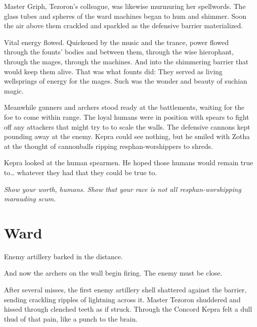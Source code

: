 \documentclass
  [a4paper,
   12pt,
   oneside
  ]%
  {article}
\begin{document}
Master Griph, Tezoron's colleague, was likewise murmuring her spellwords. 
The glass tubes and spheres of the ward machines began to hum and shimmer. Soon the air above them crackled and sparkled as the defensive barrier materialized.

Vital energy flowed. 
Quickened by the music and the trance, power flowed through the founts' bodies and between them, through the wise hierophant, through the mages, through the machines. And into the shimmering barrier that would keep them alive. 
That was what founts did: They served as living wellsprings of energy for the mages.
Such was the wonder and beauty of suchian magic.

Meanwhile gunners and archers stood ready at the battlements, waiting for the foe to come within range. 
The loyal humans were in position with spears to fight off any attackers that might try to to scale the walls. 
The defensive cannons kept pounding away at the enemy. Kepra could see nothing, but he smiled with Zotha at the thought of cannonballs ripping resphan-worshippers to shreds.


Kepra looked at the human spearmen. He hoped those humans would remain true to… whatever they had that they could be true to. 

\emph{Show your worth, humans. Show that your race is not all resphan-worshipping marauding scum.}



\section{Ward}
Enemy artillery barked in the distance.

And now the archers on the wall begin firing. The enemy must be close.

After several misses, the first enemy artillery shell shattered against the barrier, sending crackling ripples of lightning across it. Master Tezoron shuddered and hissed through clenched teeth as if struck. Through the Concord Kepra felt a dull thud of that pain, like a punch to the brain. 
\end{document}
